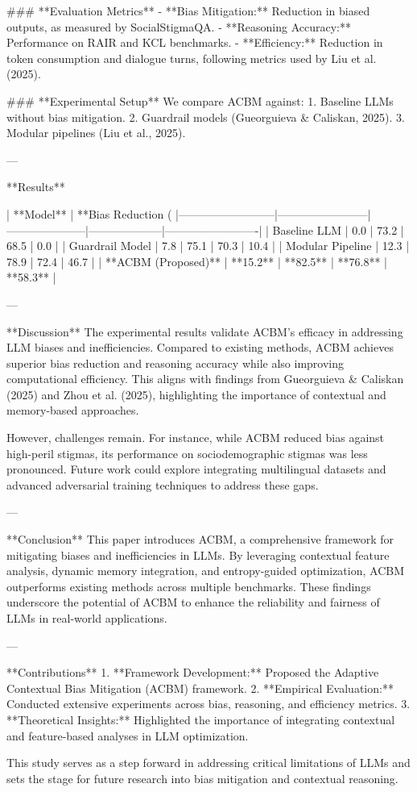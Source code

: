 ### **Evaluation Metrics**  
- **Bias Mitigation:** Reduction in biased outputs, as measured by SocialStigmaQA.  
- **Reasoning Accuracy:** Performance on RAIR and KCL benchmarks.  
- **Efficiency:** Reduction in token consumption and dialogue turns, following metrics used by Liu et al. (2025).  

### **Experimental Setup**  
We compare ACBM against:  
1. Baseline LLMs without bias mitigation.  
2. Guardrail models (Gueorguieva & Caliskan, 2025).  
3. Modular pipelines (Liu et al., 2025).  

---

**Results**  

| **Model**                | **Bias Reduction (%
|--------------------------|------------------------|---------------------|--------------------|-------------------------|  
| Baseline LLM             | 0.0                   | 73.2               | 68.5              | 0.0                    |  
| Guardrail Model          | 7.8                   | 75.1               | 70.3              | 10.4                   |  
| Modular Pipeline         | 12.3                  | 78.9               | 72.4              | 46.7                   |  
| **ACBM (Proposed)**      | **15.2**              | **82.5**           | **76.8**          | **58.3**               |  

---

**Discussion**  
The experimental results validate ACBM's efficacy in addressing LLM biases and inefficiencies. Compared to existing methods, ACBM achieves superior bias reduction and reasoning accuracy while also improving computational efficiency. This aligns with findings from Gueorguieva & Caliskan (2025) and Zhou et al. (2025), highlighting the importance of contextual and memory-based approaches.  

However, challenges remain. For instance, while ACBM reduced bias against high-peril stigmas, its performance on sociodemographic stigmas was less pronounced. Future work could explore integrating multilingual datasets and advanced adversarial training techniques to address these gaps.  

---

**Conclusion**  
This paper introduces ACBM, a comprehensive framework for mitigating biases and inefficiencies in LLMs. By leveraging contextual feature analysis, dynamic memory integration, and entropy-guided optimization, ACBM outperforms existing methods across multiple benchmarks. These findings underscore the potential of ACBM to enhance the reliability and fairness of LLMs in real-world applications.  

---

**Contributions**  
1. **Framework Development:** Proposed the Adaptive Contextual Bias Mitigation (ACBM) framework.  
2. **Empirical Evaluation:** Conducted extensive experiments across bias, reasoning, and efficiency metrics.  
3. **Theoretical Insights:** Highlighted the importance of integrating contextual and feature-based analyses in LLM optimization.  

This study serves as a step forward in addressing critical limitations of LLMs and sets the stage for future research into bias mitigation and contextual reasoning.